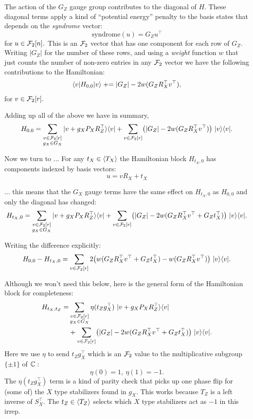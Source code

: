 \documentclass[12pt]{article}
\begin{document}
The action of the $G_Z$ gauge group
contributes to the diagonal of $H.$
These diagonal terms apply a kind of
``potential energy'' penalty
to the basis states
that depends on the \emph{syndrome} vector:
$$
    \mbox{syndrome}(u) = G_Z u^\top
$$
for $u\in \mathcal{F}_2[n].$
This is an $\mathcal{F}_2$ vector that has one component for
each row of $G_Z.$
Writing $|G_Z|$ for the number of these rows, and 
using a \emph{weight} function $w$ that just counts
the number of non-zero entries in any $\mathcal{F}_2$ vector
we have the following contributions to
the Hamiltonian:
$$
    \langle{v}| H_{0,0} |{v}\rangle 
        \mathrel{+}= |G_Z| - 2w(G_Z R_X^\top v^\top),
$$
for $v\in \mathcal{F}_2[r].$

Adding up all of the above we
have in summary,
$$
H_{0,0} = \sum_{\substack{v\in\mathcal{F}_2[r]\\g_X\in G_X } }
  |{v+g_X P_X R_Z^\top}\rangle\langle{v}| 
  + \sum_{v\in\mathcal{F}_2[r]} \bigl(|G_Z| - 2w(G_Z R_X^\top v^\top)
    \bigr) \ |{v}\rangle\langle{v}|.
$$

Now we turn to ...
For any $t_X\in \langle T_X \rangle$ the Hamiltonian block $H_{t_X,0}$
has components indexed by basis vectors:
$$
    u = v R_X + t_X
$$

... this means that the $G_X$ gauge terms
have the same effect on $H_{t_X,0}$
as $H_{0,0}$ and only the diagonal has changed:
$$
H_{t_X,0} = \sum_{\substack{v\in\mathcal{F}_2[r]\\g_X\in G_X } }
  |{v+g_X P_X R_Z^\top}\rangle\langle{v}| 
  + \sum_{v\in\mathcal{F}_2[r]} \bigl(
    |G_Z| - 2w(G_Z R_X^\top v^\top + G_Z t_X^\top)
    \bigr) \ |{v}\rangle\langle{v}|.
$$

Writing the difference explicitly:
$$
    H_{0,0} - H_{t_X,0} = 
  \sum_{v\in\mathcal{F}_2[r]} 2\bigl(
    w(G_Z R_X^\top v^\top + G_Z t_X^\top)
    -w(G_Z R_X^\top v^\top)
    \bigr) \ |{v}\rangle\langle{v}|.
$$

Although we won't need this below,
here is the general form of
the Hamiltonian block for completeness:
\begin{align*}
H_{t_X,t_Z} = &\sum_{\substack{v\in\mathcal{F}_2[r]\\g_X\in G_X } }
    \eta(t_Z g_X^\top)
  \ |{v+g_X P_X R_Z^\top}\rangle\langle{v}| \\
  &+ \sum_{v\in\mathcal{F}_2[r]} \bigl(
    |G_Z| - 2w(G_Z R_X^\top v^\top + G_Z t_X^\top)
    \bigr) \ |{v}\rangle\langle{v}|.
\end{align*}
Here we use $\eta$ to send 
$t_Zg_X^\top$ which is an $\mathcal{F}_2$ value
to the multiplicative subgroup $\{\pm1\}$
of $\mathbb{C}:$
$$
    \eta(0) = 1,\ \eta(1) = -1.
$$
The $\eta(t_Zg_X^\top)$ term
is a kind of parity check that
picks up one phase flip for (some of)
the $X$ type stabilizers found in $g_X.$
This works because $T_Z$ is a left inverse
of $S_X^\top.$
The $t_Z\in\langle T_Z \rangle$ selects which
$X$ type stabilizers act as $-1$ in this irrep.
\end{document}
